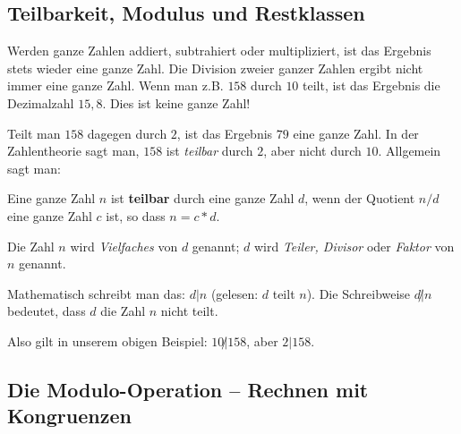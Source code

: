 \begin{refsegment}
\section[Teilbarkeit, Modulus und Restklassen]
        {Teilbarkeit, Modulus und Restklassen\footnotemark}
{} 
Werden ganze Zahlen addiert, subtrahiert oder multipliziert, ist das
Ergebnis stets wieder eine ganze Zahl.
Die Division zweier ganzer Zahlen ergibt nicht immer eine ganze Zahl. Wenn
man z.B. $158$ durch $10$ teilt, ist das Ergebnis die Dezimalzahl $15,8$.
Dies ist keine ganze Zahl!

Teilt man $158$ dagegen durch $2$, ist das Ergebnis $79$ eine ganze Zahl.
In der Zahlentheorie sagt man, $158$ ist {\em teilbar} durch $2$, aber nicht durch $10$.
Allgemein sagt man:

\begin{definition}\label{def-zth-divisibility} 
Eine ganze Zahl $n$ ist \textbf{teilbar} durch eine ganze Zahl $d$, wenn der
Quotient $n/d$ eine ganze Zahl $c$ ist, so dass $n = c * d$.
\end{definition}

Die Zahl $n$ wird {\em Vielfaches} von $d$ genannt; $d$ wird {\em Teiler,
Divisor}   oder  {\em Faktor} von
$n$ genannt.

Mathematisch schreibt man das: $d | n$ (gelesen: \glqq  $d$ teilt $n$\grqq).
Die Schreibweise $d \!\!\not| n$ bedeutet, dass $d$ die Zahl $n$ nicht teilt.

Also gilt in unserem obigen Beispiel: $10\!\!\not| 158$, aber $2 | 158$.


\subsection{Die Modulo-Operation -- Rechnen mit Kongruenzen} 


\end{refsegment}

